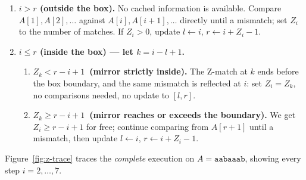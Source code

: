 \begin{enumerate}[noitemsep, topsep=3pt]
  \item \textbf{$i > r$ (outside the box).}
        No cached information is available.
        Compare $A[1], A[2], \ldots$ against $A[i], A[i+1], \ldots$ directly
        until a mismatch; set $Z_i$ to the number of matches.
        If $Z_i > 0$, update $l \gets i$,\; $r \gets i + Z_i - 1$.

  \item \textbf{$i \leq r$ (inside the box) — let $k = i{-}l{+}1$.}
        \begin{enumerate}[label=(\alph*), noitemsep, topsep=2pt]
          \item \textbf{$Z_k < r - i + 1$\ (mirror strictly inside).}
                The Z-match at $k$ ends before the box boundary, and the same
                mismatch is reflected at $i$: set $Z_i = Z_k$, no comparisons
                needed, no update to $[l,r]$.
          \item \textbf{$Z_k \geq r - i + 1$\ (mirror reaches or exceeds the boundary).}
                We get $Z_i \geq r{-}i{+}1$ for free; continue comparing from
                $A[r+1]$ until a mismatch, then update $l \gets i$,\;
                $r \gets i + Z_i - 1$.
        \end{enumerate}
\end{enumerate}

Figure~\ref{fig:z-trace} traces the \emph{complete} execution on
$A = \texttt{aabaaab}$, showing every step $i = 2, \ldots, 7$.

